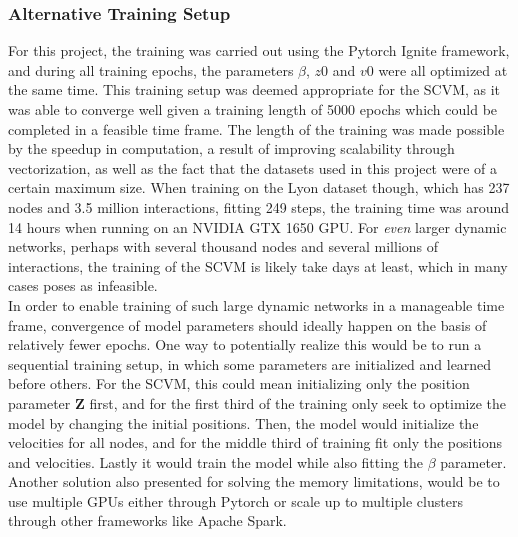\subsubsection{Alternative Training Setup}
\label{sec:Discussion:Results:AlternativeTrainingSetups}
For this project, the training was carried out using the Pytorch Ignite framework, and during all training epochs, the parameters $\beta$, $z0$ and $v0$ were all optimized at the same time.
This training setup was deemed appropriate for the SCVM, as it was able to converge well given a training length of 5000 epochs which could be completed in a feasible time frame.
The length of the training was made possible by the speedup in computation, a result of improving scalability through vectorization, as well as the fact that the datasets used in this project were of a certain maximum size.
When training on the Lyon dataset though, which has 237 nodes and 3.5 million interactions, fitting 249 steps, the training time was around 14 hours when running on an NVIDIA GTX 1650 GPU.
For \textit{even} larger dynamic networks, perhaps with several thousand nodes and several millions of interactions, the training of the SCVM is likely take days at least, which in many cases poses as infeasible. 
\\
In order to enable training of such large dynamic networks in a manageable time frame, convergence of model parameters should ideally happen on the basis of relatively fewer epochs.
One way to potentially realize this would be to run a sequential training setup, in which some parameters are initialized and learned before others.
For the SCVM, this could mean initializing only the position parameter $\textbf{Z}$ first, and for the first third of the training only seek to optimize the model by changing the initial positions.
Then, the model would initialize the velocities for all nodes, and for the middle third of training fit only the positions and velocities. 
Lastly it would train the model while also fitting the $\beta$ parameter.
Another solution also presented for solving the memory limitations, would be to use multiple GPUs either through Pytorch or scale up to multiple clusters through other frameworks like Apache Spark\cite{ApacheAnalytics}.